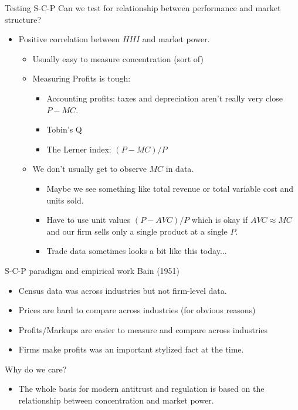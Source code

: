 \documentclass[xcolor=pdftex,dvipsnames,table,mathserif,aspectratio=169]{beamer}
\begin{document}
\begin{frame}{Testing S-C-P }
Can we test for relationship between performance and market structure?
\begin{itemize}
\item Positive correlation between $HHI$ and market power.
\begin{itemize}
\item Usually easy to measure concentration (sort of)
\item Measuring Profits is tough:
\begin{itemize}
\item Accounting profits: taxes and depreciation aren't really very close $P-MC$.
\item Tobin's Q
\item The Lerner index: $(P-MC)/P$
\end{itemize}
\item We don't usually get to observe $MC$ in data.

\begin{itemize}
\item Maybe we see something like total revenue or total variable cost and units sold.
\item Have to use unit values $(P-AVC)/P$ which is okay if $AVC \approx MC$ and our firm sells only a single product at a single $P$.
\item Trade data sometimes looks a bit like this today...
\end{itemize}
\end{itemize}
\end{itemize}
\end{frame}


\begin{frame}{S-C-P paradigm and empirical work}
Bain (1951)
\begin{itemize}
\item Census data was across industries but not firm-level data.
\item Prices are hard to compare across industries (for obvious reasons)
\item Profits/Markups are easier to measure and compare across industries
\item Firms make profits was an important stylized fact at the time.
\end{itemize}
Why do we care?
\begin{itemize}
\item The whole basis for modern antitrust and regulation is based on the relationship between concentration and market power.
\end{itemize}
\end{frame}
\end{document}
